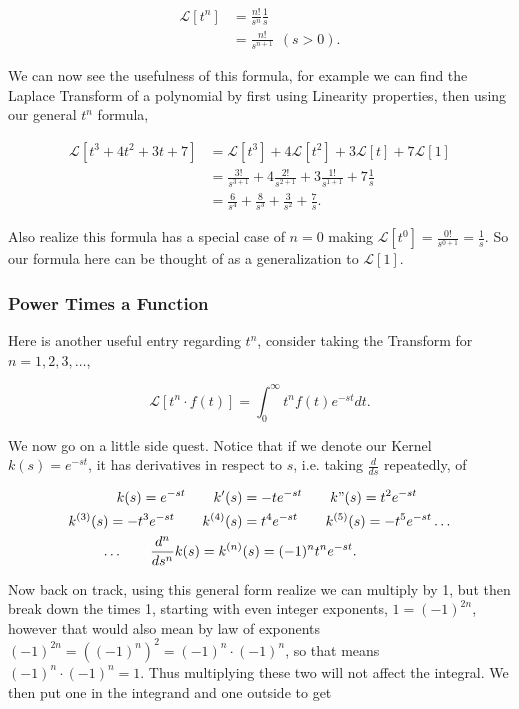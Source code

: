 \documentclass[12pt]{article}
\newcommand{\lp}{\mathscr{L}}
\begin{document}
\begin{align*}
     \lp[t^n] &= \frac{n!}{s^n} \frac{1}{s} \\
      &= \frac{n!}{s^{n+1}} \hspace{5pt} (s>0).
\end{align*}

We can now see the usefulness of this formula, for example we can find the Laplace Transform of a polynomial by first using Linearity properties, then using our general $t^n$ formula,

\begin{align*}
    \lp[t^3+4t^2+3t+7] &= \lp[t^3]+4\lp[t^2]+3\lp[t]+7\lp[1] \\
    &= \frac{3!}{s^{3+1}} + 4\frac{2!}{s^{2+1}} + 3\frac{1!}{s^{1+1}} +7 \frac{1}{s} \\
    &= \frac{6}{s^{4}} + \frac{8}{s^{3}} + \frac{3}{s^{2}} + \frac{7}{s}.
\end{align*}

Also realize this formula has a special case of $n=0$ making $\lp[t^0]=\frac{0!}{s^{0+1}}=\frac{1}{s}$. So our formula here can be thought of as a generalization to $\lp[1]$.

\subsubsection{Power Times a Function}

Here is another useful entry regarding $t^n$, consider taking the Transform for $n=1,2,3,\ldots$,

\begin{equation*}
    \lp[t^n \cdot f(t)]=\int_0^{\infty} t^n f(t) e^{-st} dt.
\end{equation*}

We now go on a little side quest. Notice that if we denote our Kernel $k(s)=e^{-st}$, it has derivatives in respect to $s$, i.e. taking $\frac{d}{ds}$ repeatedly, of 

\begin{align*}
    k(s)=e^{-st} \qquad k'(s)&=-te^{-st} \qquad k"(s)=t^2e^{-st} \\
    k^{(3)}(s)=-t^3e^{-st} \qquad k^{(4)}(s)&=t^4e^{-st} \qquad k^{(5)}(s)=-t^5e^{-st} \ldots \\
    \ldots \qquad \frac{d^n}{ds^n}k(s)=k^{(n)}&(s)=(-1)^n t^n e^{-st}.
\end{align*}

Now back on track, using this general form realize we can multiply by 1, but then break down the times 1, starting with even integer exponents, $1=(-1)^{2n}$, however that would also mean by law of exponents $(-1)^{2n}=\left((-1)^n\right)^2=(-1)^n\cdot(-1)^n$, so that means $(-1)^n\cdot(-1)^n=1$. Thus multiplying these two will not affect the integral. We then put one in the integrand and one outside to get
\end{document}
